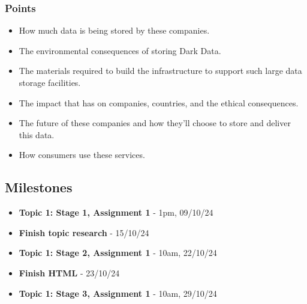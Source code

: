 \documentclass{article}
\begin{document}
        \subsubsection{Points}
        \begin{itemize}
            \item How much data is being stored by these companies.
            \item The environmental consequences of storing Dark Data.
            \item The materials required to build the infrastructure to support such large data storage facilities.
            \item The impact that has on companies, countries, and the ethical consequences.
            \item The future of these companies and how they'll choose to store and deliver this data.
            \item How consumers use these services.
        \end{itemize} 

\subsection{Milestones}
    \begin{itemize}
        \item \textbf{Topic 1: Stage 1, Assignment 1} - 1pm, 09/10/24
        \item \textbf{Finish topic research} - 15/10/24
        \item \textbf{Topic 1: Stage 2, Assignment 1} - 10am, 22/10/24
        \item \textbf{Finish HTML} - 23/10/24
        \item \textbf{Topic 1: Stage 3, Assignment 1} - 10am, 29/10/24
    \end{itemize}
\end{document}
